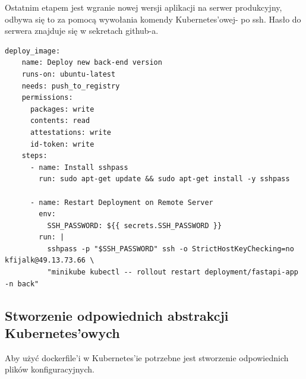 Ostatnim etapem jest wgranie nowej wersji aplikacji na serwer produkcyjny, odbywa się to za pomocą wywołania komendy Kubernetes'owej- po ssh. Hasło do serwera znajduje się w sekretach github-a.
\begin{verbatim}
deploy_image:
    name: Deploy new back-end version
    runs-on: ubuntu-latest
    needs: push_to_registry
    permissions:
      packages: write
      contents: read
      attestations: write
      id-token: write
    steps:
      - name: Install sshpass
        run: sudo apt-get update && sudo apt-get install -y sshpass

      - name: Restart Deployment on Remote Server
        env:
          SSH_PASSWORD: ${{ secrets.SSH_PASSWORD }}
        run: |
          sshpass -p "$SSH_PASSWORD" ssh -o StrictHostKeyChecking=no kfijalk@49.13.73.66 \
          "minikube kubectl -- rollout restart deployment/fastapi-app -n back"
\end{verbatim}



\subsection{Stworzenie  odpowiednich abstrakcji Kubernetes'owych}
Aby użyć dockerfile'i w Kubernetes'ie potrzebne jest stworzenie odpowiednich plików konfiguracyjnych. 
